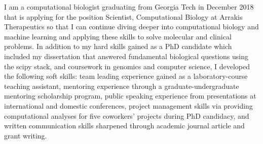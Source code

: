 

\begin{cventries}


\fontsize{10pt}{1em}\bodyfontlight\upshape\color{black}\justify
I am a computational biologist graduating from Georgia Tech in December 2018 that is applying for the position Scientist, Computational Biology at Arrakis Therapeutics so that I can continue diving deeper into computational biology and machine learning and applying these skills to solve molecular and clinical problems. In addition to my hard skills gained as a PhD candidate which included my dissertation that answered fundamental biological questions using the scipy stack, and coursework in genomics and computer science, I developed the following soft skills: team leading experience gained as a laboratory-course teaching assistant, mentoring experience through a graduate-undergraduate mentoring scholarship program, public speaking experience from presentations at international and domestic conferences, project management skills via providing computational analyses for five coworkers' projects during PhD candidacy, and written communication skills sharpened through academic journal article and grant writing.
    
\vspace{-2.0mm}
\end{cventries}
